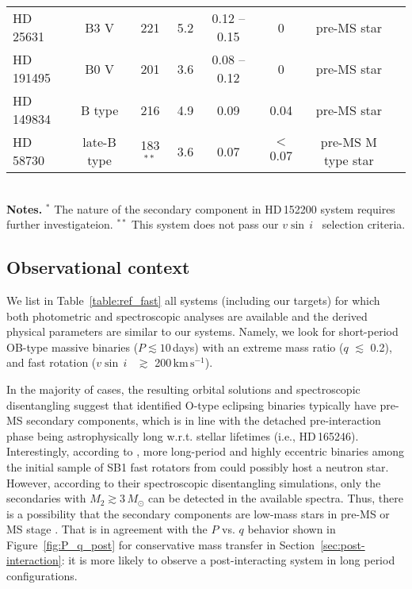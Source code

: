 \documentclass{aa}
\newcommand{\kms}{$\mathrm{km\,s^{-1}}$}
\newcommand{\vsini} {$v\sin\,i$}
\DeclareRobustCommand{\Figref}[1]{Figure~\ref{#1}}
\DeclareRobustCommand{\Tabref}[1]{Table~\ref{#1}}
\DeclareRobustCommand{\Secref}[1]{Section~\ref{#1}}
\newcommand{\mr}[1]{\textcolor{green!50!black}{#1}}
\begin{document}
\begin{table*}[!htbp]
{\begin{tabular}{l |c c c c c c c}
HD\,25631         &   B3 V    &     221        &    5.2     &     0.12 -- 0.15             &  0     &  pre-MS star     &   \citet{Naze_2023_rot}     \\
HD\,191495         &   B0 V    &     201        &    3.6     &     0.08 -- 0.12             &  0     &  pre-MS star     &   \citet{Naze_2023_rot}     \\
HD\,149834             &   B type     &     216        &    4.9     &     0.09             &  0.04     &  pre-MS star     &   \citet{Stassun_2021}   \\
HD\,58730      &   late-B type   &     183 $^{\ast\ast}$       &    3.6     &     0.07            &  $<$ 0.07     &  pre-MS M type star     &   \citet{Stevens_2020}     \\
\hline
\end{tabular}
\\
{\bf Notes.}  $^{\ast}$ The nature of the secondary component in HD\,152200 system requires further investigateion. $^{\ast\ast}$ This system does not pass our \vsini~ selection criteria. }
\end{table*}
\subsection{Observational context}

We list in \Tabref{table:ref_fast} all systems (including our targets) for which both
  photometric and spectroscopic analyses are available and the derived physical parameters are similar to our
systems. Namely, we look for short-period OB-type massive binaries
($P\lesssim 10$\,days) with an extreme mass ratio ($q$ $\lesssim$ 0.2), and
fast rotation (\vsini~ $\gtrsim$ 200\,\kms).

In the majority of cases, the resulting orbital solutions and spectroscopic disentangling suggest that
  identified O-type eclipsing binaries typically have pre-MS secondary
  components, which is in line with the detached pre-interaction phase being
  astrophysically long w.r.t. stellar lifetimes (i.e., HD\,165246). Interestingly,
according to \citet{Mahy_2022}, more long-period and highly eccentric
binaries among the initial sample of SB1 fast rotators from
\citet{Britavskiy_2023} could possibly host a neutron
star. However, according to their spectroscopic disentangling simulations, only
the secondaries with  $M_2\gtrsim 3\,M_{\odot}$ can be detected in the
available spectra. Thus, there is a possibility that the secondary components are
  low-mass stars in pre-MS or MS stage \citep[e.g., HD\,15137 and HD\,165174 in][]{Mahy_2022}.
That is in agreement with the $P$ vs. $q$ behavior shown in \Figref{fig:P_q_post} for conservative mass
transfer in \Secref{sec:post-interaction}: it is more likely to observe a post-interacting system in long period configurations.
\end{document}
